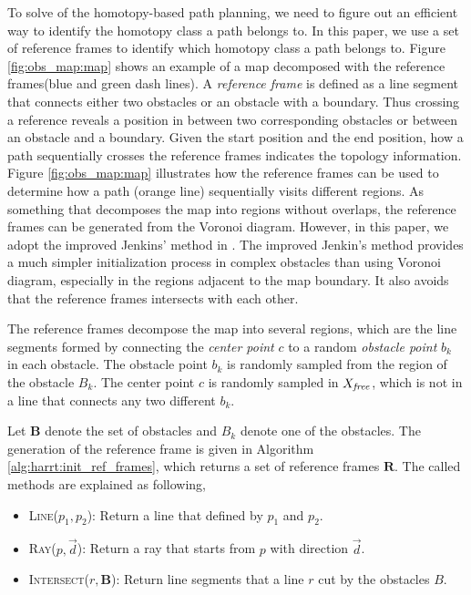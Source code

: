 \documentclass[letterpaper, 10 pt, conference]{ieeeconf}
\begin{document}
To solve of the homotopy-based path planning, we need to figure out an efficient way to identify the homotopy class a path belongs to.
In this paper, we use a set of reference frames to identify which homotopy class a path belongs to.
Figure \ref{fig:obs_map:map} shows an example of a map decomposed with the reference frames(blue and green dash lines).
A \emph{reference frame} is defined as a line segment that connects either two obstacles or  an obstacle with a boundary. Thus crossing a reference reveals a position in between two corresponding obstacles or between an obstacle and a boundary.
Given the start position and the end position, how a path sequentially crosses the reference frames indicates the topology information.
Figure \ref{fig:obs_map:map} illustrates how the reference frames can be used to determine how a path (orange line) sequentially visits different regions.
As something that decomposes the map into regions without overlaps, the reference frames can be generated from the Voronoi diagram.
However, in this paper, we adopt the improved Jenkins' method in \cite{Hernandez201544}.
The improved Jenkin's method provides a much simpler initialization process in complex obstacles than using Voronoi diagram, especially in the regions adjacent to the map boundary.
It also avoids that the reference frames intersects with each other.

The reference frames decompose the map into several regions, which are the line segments formed by connecting the \emph{center point} $ c $ to a random \emph{obstacle point} $ b_{k} $ in each obstacle.
The obstacle point $ b_{k} $ is randomly sampled from the region of the obstacle $ B_{k} $.
The center point $ c $ is randomly sampled in $ X_{\it free} $, which is not in a line that connects any two different $ b_{k} $.


Let $ \bm{B} $ denote the set of obstacles and $ B_{k} $ denote one of the obstacles.  
The generation of the reference frame is given in Algorithm \ref{alg:harrt:init_ref_frames}, which returns a set of reference frames $ \bm{R} $.
The called methods are explained as following,
\begin{itemize}
	\item \textsc{Line}($ p_{1}, p_{2} $):
	Return a line that defined by $ p_{1} $ and $ p_{2} $.
	\item \textsc{Ray}($ p, \vec{d} $):
	Return a ray that starts from $ p $ with direction $ \vec{d}  $.
	\item \textsc{Intersect}($ r , \bm{B} $):
	Return line segments that a line $ r $ cut by the obstacles $ B $.
\end{itemize}
\end{document}
